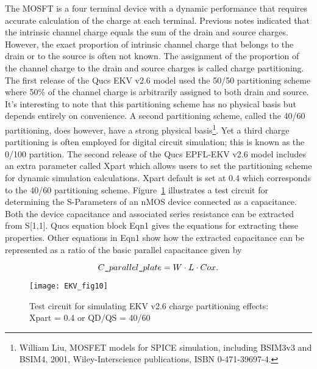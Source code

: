 
The MOSFT is a four terminal device with a dynamic performance that
requires accurate calculation of the charge at each terminal. Previous
notes indicated that the intrinsic channel charge equals the sum of
the drain and source charges.  However, the exact proportion of
intrinsic channel charge that belongs to the drain or to the source is
often not known.  The assignment of the proportion of the channel
charge to the drain and source charges is called charge partitioning.
The first release of the Qucs EKV v2.6 model used the 50/50
partitioning scheme where 50\% of the channel charge is arbitrarily
assigned to both drain and source. It's interesting to note that this
partitioning scheme has no physical basis but depends entirely on
convenience. A second partitioning scheme, called the 40/60
partitioning, does however, have a strong physical
basis\footnote{William Liu, MOSFET models for SPICE simulation,
including BSIM3v3 and BSIM4, 2001, Wiley-Interscience publications,
ISBN 0-471-39697-4.}. Yet a third charge partitioning is often
employed for digital circuit simulation; this is known as the 0/100
partition. The second release of the Qucs EPFL-EKV v2.6 model includes
an extra parameter called Xpart which allows users to set the
partitioning scheme for dynamic simulation calculations. Xpart default
is set at 0.4 which corresponds to the 40/60 partitioning
scheme. Figure~\ref{fig:EKV10} illustrates a test circuit for
determining the S-Parameters of an nMOS device connected as a
capacitance. Both the device capacitance and associated series
resistance can be extracted from S[1,1]. Qucs equation block Eqn1
gives the equations for extracting these properties. Other equations
in Eqn1 show how the extracted capacitance can be represented as a
ratio of the basic parallel capacitance given by

\begin{equation}
C\verb|_|parallel\verb|_|plate = W\cdot L \cdot Cox.
\end{equation}

\begin{figure}
  \centering
  \texttt{[image: EKV\_fig10]}
  \caption{Test circuit for simulating EKV v2.6 charge partitioning effects: Xpart = 0.4 or QD/QS = 40/60}
  \label{fig:EKV10}
\end{figure}  



